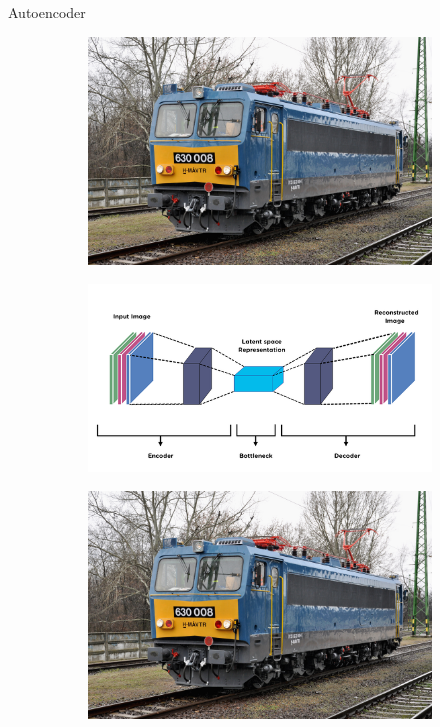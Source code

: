 \documentclass[aspectratio=169]{beamer}
\begin{document}
\begin{frame}{Autoencoder}
    \begin{figure}
        \centering
        \begin{subfigure}{0.2\textwidth}
            \centering
            \includegraphics[width=\textwidth]{./tex_images/gigant_2.jpg}
        \end{subfigure}
        \begin{subfigure}{0.4\textwidth}
            \centering
            \includegraphics[width=\textwidth]{./tex_images/autoencoder.png}
        \end{subfigure}
        \begin{subfigure}{0.2\textwidth}
            \centering
            \includegraphics[width=\textwidth]{./tex_images/gigant_2.jpg}

\end{subfigure}
\end{figure}
\end{frame}
\end{document}
